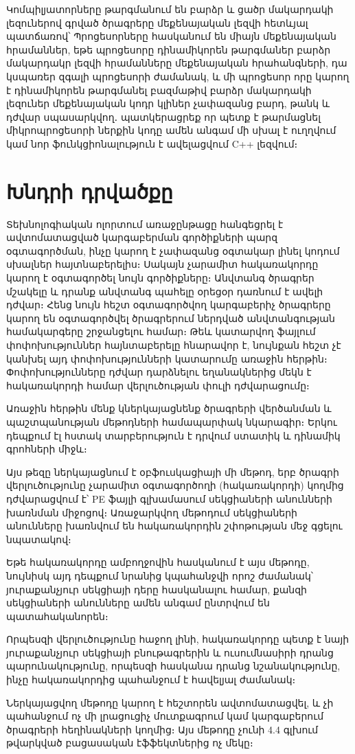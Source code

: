 \documentclass[12pt]{article}
\begin{document}
\begin{sloppypar}
Կոմպիլյատորները թարգմանում են բարձր և ցածր մակարդակի լեզուներով գրված ծրագրերը
մեքենայական լեզվի հետևյալ պատճառով՝
Պրոցեսորները հասկանում են միայն մեքենայական հրամաններ, եթե պրոցեսորը
դինամիկորեն թարգմաներ բարձր մակարդակր լեզվի հրամանները մեքենայական
հրահանգների, դա կսպառեր զգալի պրոցեսորի ժամանակ, և մի պրոցեսոր որը
կարող է դինամիկորեն թարգմանել բազմաթիվ բարձր մակարդակի լեզուներ
մեքենայական կոդր կլիներ չափազանց բարդ, թանկ և դժվար սպասարկվող․
պատկերացրեք որ պետք է թարմացնել միկրոպրոցեսորի ներքին կոդը ամեն անգամ
մի սխալ է ուղղվում կամ նոր ֆունկցիոնալություն է ավելացվում C++
լեզվում։

\section{Խնդրի դրվածքը}
Տեխնոլոգիական ոլորտում առաջընթացը հանգեցրել է ավտոմատացված կարգաբերման
գործիքների պարզ օգտագործման, ինչը կարող է չափազանց օգտակար լինել կոդում
սխալներ հայտնաբերելիս։ Սակայն չարամիտ հակառակորդը կարող է օգտագործել
նույն գործիքները։ Անվտանգ ծրագրեր մշակելը և դրանք անվտանգ պահելը օրեցօր
դառնում է ավելի դժվար։ Հենց նույն հեշտ օգտագործվող կարգաբերիչ ծրագրերը
կարող են օգտագործվել ծրագրերում ներդված անվտանգության համակարգերը
շրջանցելու համար։ Թեև կատարվող ֆայլում փոփոխություններ հայնտաբերելը
հնարավոր է, նույնքան հեշտ չէ կանխել այդ փոփոխությունների կատարումը
առաջին հերթին։ Փոփոխությունները դժվար դարձնելու եղանակներից մեկն է
հակառակորդի համար վերլուծության փուլի դժվարացումը։

Առաջին հերթին մենք կներկայացնենք ծրագրերի վերծանման և պաշտպանության մեթոդների
համապարփակ նկարագիր։ Երկու դեպքում էլ հստակ տարբերություն է դրվում ստատիկ և
դինամիկ գրոհների միջև։

Այս թեզը ներկայացնում է օբֆուսկացիայի մի մեթոդ, երբ ծրագրի վերլուծությունը
չարամիտ օգտագործողի (հակառակորդի) կողմից դժվարացվում է՝ PE ֆայլի գլխամասում
սեկցիաների անունների խառնման միջոցով։ Առաջարկվող մեթոդում սեկցիաների
անունները խառնվում են հակառակորդին շփոթության մեջ գցելու նպատակով։

Եթե հակառակորդը ամբողջովին հասկանում է այս մեթոդը, նույնիսկ այդ
դեպքում նրանից կպահանջվի որոշ ժամանակ՝ յուրաքանչյուր սեկցիայի դերը
հասկանալու համար, քանզի սեկցիաների անունները ամեն անգամ ընտրվում են
պատահականորեն։

Որպեսզի վերլուծությունը հաջող լինի, հակառակորդը պետք է նայի յուրաքանչյուր
սեկցիայի բնութագրերին և ուսումնասիրի դրանց պարունակությունը, որպեսզի
հասկանա դրանց նշանակությունը, ինչը հակառակորդից պահանջում է հավելյալ ժամանակ։

Ներկայացվող մեթոդը կարող է հեշտորեն ավտոմատացվել, և չի պահանջում ոչ մի
լրացուցիչ մուտքագրում կամ կարգաբերում ծրագրերի հեղինակների կողմից։
Այս մեթոդը չունի 4.4 գլխում թվարկված բացասական էֆֆեկտներից ոչ մեկը։


\end{sloppypar}
\end{document}
